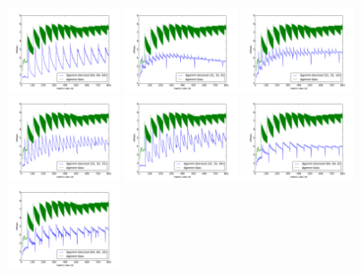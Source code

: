 \documentclass[12pt]{article}
\begin{document}
	\includegraphics[width=0.25\textwidth]{graphs/profiles/PROFILE_OUTUT_64_64.pdf} 
	\includegraphics[width=0.25\textwidth]{graphs/profiles/PROFILE_OUTUT_32_8.pdf}  
	\includegraphics[width=0.25\textwidth]{graphs/profiles/PROFILE_OUTUT_32_16.pdf}  
	\includegraphics[width=0.25\textwidth]{graphs/profiles/PROFILE_OUTUT_32_32.pdf} 
	\includegraphics[width=0.25\textwidth]{graphs/profiles/PROFILE_OUTUT_32_64.pdf} 
	\includegraphics[width=0.25\textwidth]{graphs/profiles/PROFILE_OUTUT_64_8.pdf}  
	\includegraphics[width=0.25\textwidth]{graphs/profiles/PROFILE_OUTUT_64_16.pdf}  
\end{document}
